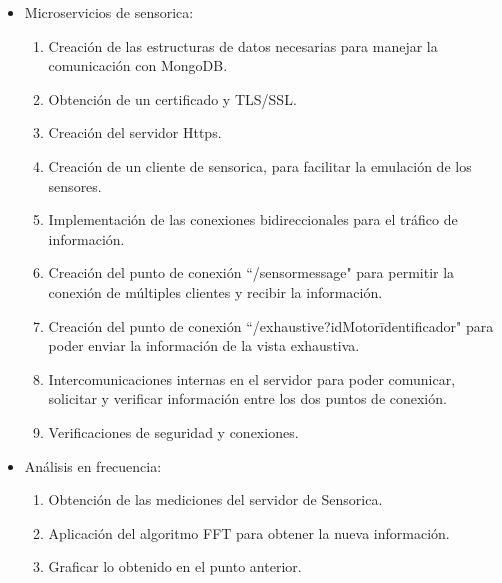\begin{itemize}
    \item Microservicios de sensorica:
        \begin{enumerate}
            \item Creación de las estructuras de datos necesarias para manejar
                la comunicación con MongoDB.
            \item Obtención de un certificado y TLS/SSL.
            \item Creación del servidor Https.
            \item Creación de un cliente de sensorica, para facilitar la emulación
                de los sensores.
            \item Implementación de las conexiones bidireccionales para el tráfico
                de información.
            \item Creación del punto de conexión ``/sensormessage" para permitir
                la conexión de múltiples clientes y recibir la información.
            \item Creación del punto de conexión ``/exhaustive?idMotor\=identificador"
                para poder enviar la información de la vista exhaustiva.
            \item Intercomunicaciones internas en el servidor para poder comunicar,
                solicitar y verificar información entre los dos puntos de conexión.
            \item Verificaciones de seguridad y conexiones.
        \end{enumerate}

    \item Análisis en frecuencia:
        \begin{enumerate}
                \item Obtención de las mediciones del servidor de Sensorica.
                \item Aplicación del algoritmo FFT para obtener la nueva
                    información.
                \item Graficar lo obtenido en el punto anterior.
        \end{enumerate}


\end{itemize}
